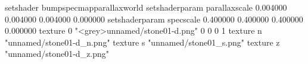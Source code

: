setshader bumpspecmapparallaxworld
setshaderparam parallaxscale 0.004000 0.004000 0.004000 0.000000
setshaderparam specscale 0.400000 0.400000 0.400000 0.000000
texture 0 "<grey>unnamed/stone01-d.png" 0 0 0 1
texture n "unnamed/stone01-d_n.png"
texture s "unnamed/stone01_s.png"
texture z "unnamed/stone01-d_z.png"